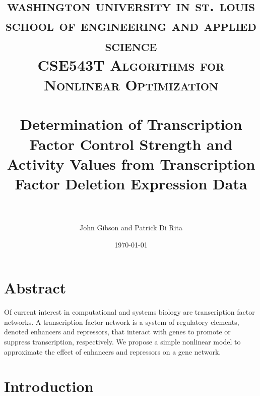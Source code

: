\documentclass[paper=a4, fontsize=11pt]{scrartcl} %
\title{	
\normalfont \normalsize 
\textsc{washington university in st. louis school of engineering and applied science} \\ [25pt] %
\normalfont \normalsize 
\textsc{CSE543T Algorithms for Nonlinear Optimization} \\ [20pt]
\horrule{0.5pt} \\[0.4cm] %
\huge Determination of Transcription Factor Control Strength and Activity Values from Transcription Factor Deletion Expression Data  \\ %
\horrule{2pt} \\[0.5cm] %
}
\author{John Gibson and Patrick Di Rita} %
\date{\normalsize\today} %
\begin{document}
\maketitle %

\section{Abstract}
Of current interest in computational and systems biology are transcription factor networks. A transcription factor network is a system of regulatory elements, denoted enhancers and repressors, that interact with genes to promote or suppress transcription, respectively. We propose a simple nonlinear model to approximate the effect of enhancers and repressors on a gene network.

\section{Introduction}
\end{document}
